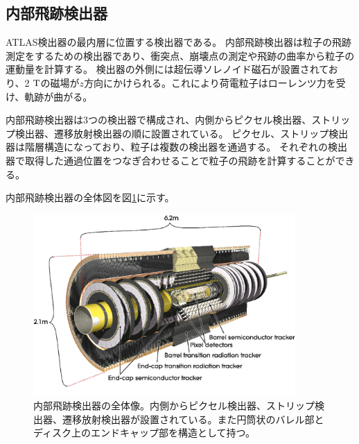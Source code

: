 
\subsection{内部飛跡検出器}
ATLAS検出器の最内層に位置する検出器である。
内部飛跡検出器は粒子の飛跡測定をするための検出器であり、衝突点、崩壊点の測定や飛跡の曲率から粒子の運動量を計算する。
検出器の外側には超伝導ソレノイド磁石が設置されており、2 $\rm{T}$の磁場が$z$方向にかけられる。これにより荷電粒子はローレンツ力を受け、軌跡が曲がる。

内部飛跡検出器は3つの検出器で構成され、内側からピクセル検出器、ストリップ検出器、遷移放射検出器の順に設置されている。
ピクセル、ストリップ検出器は階層構造になっており、粒子は複数の検出器を通過する。
それぞれの検出器で取得した通過位置をつなぎ合わせることで粒子の飛跡を計算することができる。

内部飛跡検出器の全体図を図\ref{inner_detector}に示す。

\begin{figure}[bpt]\centering
\includegraphics[width=10cm]{./inner_detector.png}
\caption[内部飛跡検出器の全体像]{内部飛跡検出器の全体像\cite{1-2}。内側からピクセル検出器、ストリップ検出器、遷移放射検出器が設置されている。また円筒状のバレル部とディスク上のエンドキャップ部を構造として持つ。}
\label{inner_detector}
\end{figure}


%

